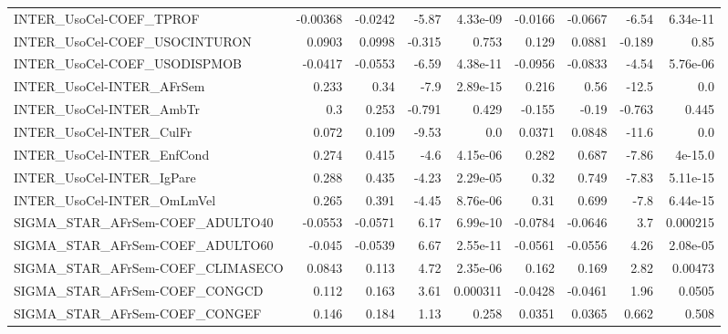 \begin{tabular}{lrrrrrrrr}
INTER\_UsoCel-COEF\_TPROF               &    -0.00368 &      -0.0242 &   -5.87 & 4.33e-09 &    -0.0166 &     -0.0667 &        -6.54 &      6.34e-11 \\
INTER\_UsoCel-COEF\_USOCINTURON         &      0.0903 &       0.0998 &  -0.315 &    0.753 &      0.129 &      0.0881 &       -0.189 &          0.85 \\
INTER\_UsoCel-COEF\_USODISPMOB          &     -0.0417 &      -0.0553 &   -6.59 & 4.38e-11 &    -0.0956 &     -0.0833 &        -4.54 &      5.76e-06 \\
INTER\_UsoCel-INTER\_AFrSem             &       0.233 &         0.34 &    -7.9 & 2.89e-15 &      0.216 &        0.56 &        -12.5 &           0.0 \\
INTER\_UsoCel-INTER\_AmbTr              &         0.3 &        0.253 &  -0.791 &    0.429 &     -0.155 &       -0.19 &       -0.763 &         0.445 \\
INTER\_UsoCel-INTER\_CulFr              &       0.072 &        0.109 &   -9.53 &      0.0 &     0.0371 &      0.0848 &        -11.6 &           0.0 \\
INTER\_UsoCel-INTER\_EnfCond            &       0.274 &        0.415 &    -4.6 & 4.15e-06 &      0.282 &       0.687 &        -7.86 &       4e-15.0 \\
INTER\_UsoCel-INTER\_IgPare             &       0.288 &        0.435 &   -4.23 & 2.29e-05 &       0.32 &       0.749 &        -7.83 &      5.11e-15 \\
INTER\_UsoCel-INTER\_OmLmVel            &       0.265 &        0.391 &   -4.45 & 8.76e-06 &       0.31 &       0.699 &         -7.8 &      6.44e-15 \\
SIGMA\_STAR\_AFrSem-COEF\_ADULTO40       &     -0.0553 &      -0.0571 &    6.17 & 6.99e-10 &    -0.0784 &     -0.0646 &          3.7 &      0.000215 \\
SIGMA\_STAR\_AFrSem-COEF\_ADULTO60       &      -0.045 &      -0.0539 &    6.67 & 2.55e-11 &    -0.0561 &     -0.0556 &         4.26 &      2.08e-05 \\
SIGMA\_STAR\_AFrSem-COEF\_CLIMASECO      &      0.0843 &        0.113 &    4.72 & 2.35e-06 &      0.162 &       0.169 &         2.82 &       0.00473 \\
SIGMA\_STAR\_AFrSem-COEF\_CONGCD         &       0.112 &        0.163 &    3.61 & 0.000311 &    -0.0428 &     -0.0461 &         1.96 &        0.0505 \\
SIGMA\_STAR\_AFrSem-COEF\_CONGEF         &       0.146 &        0.184 &    1.13 &    0.258 &     0.0351 &      0.0365 &        0.662 &         0.508 \\

\end{tabular}
